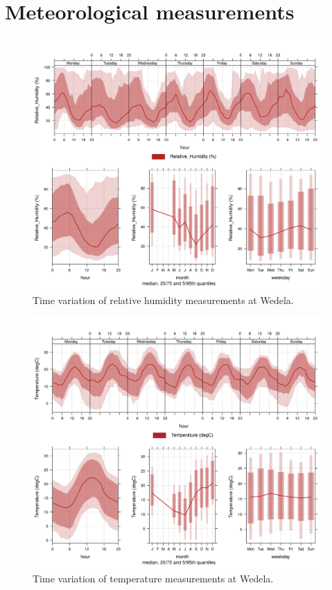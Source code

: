\documentclass{nwureport}
\begin{document}
\section{Meteorological measurements}

\begin{figure}[!htb]
    \centering
    \includegraphics[width=\textwidth]{images/Wedela_Relative_Humidity_timevary.png}
    \caption[Time variation of relative humidity measurements at Wedela.]{Time variation of relative humidity measurements at Wedela.}
    \label{fig:summary-rh}
\end{figure}

\begin{figure}[!htb]
    \centering
    \includegraphics[width=\textwidth]{images/Wedela_Temperature_timevary.png}
    \caption[Time variation of temperature measurements at Wedela.]{Time variation of temperature measurements at Wedela.}
    \label{fig:summary-tmp}
\end{figure}
\end{document}
